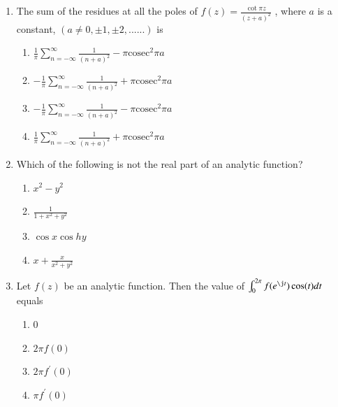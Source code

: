\documentclass[journal,12pt,twocolumn]{IEEEtran}
\begin{document}
\begin{enumerate}[1.]
\item The sum of the residues at all the poles of $ f(z) = \frac{\cot \pi z}{(z+a) ^ 2}$ , where $a$ is a constant, $(a \neq 0, \pm 1, \pm 2,......)$ is

\begin{enumerate}

\item $
\frac{1}{\pi} \sum\limits_{n= -\infty}^{\infty} \frac{1}{(n+a)^2} - \pi \text{cosec}^2 \pi a
$


\item $
-\frac{1}{\pi} \sum\limits_{n= -\infty}^{\infty} \frac{1}{(n+a)^2} + \pi \text{cosec}^2 \pi a
$


\item $
-\frac{1}{\pi} \sum\limits_{n= -\infty}^{\infty} \frac{1}{(n+a)^2} - \pi \text{cosec}^2 \pi a
$


\item $
\frac{1}{\pi} \sum\limits_{n= -\infty}^{\infty} \frac{1}{(n+a)^2} + \pi \text{cosec}^2 \pi a
$

\end{enumerate}

\item Which of the following is not the real part of an analytic function?

\begin{enumerate}

\item $
x^2-y^2
$

\item $
\frac{1}{1+x^2+y^2}
$

\item $
\cos x \cos h y
$

\item $
x+ \frac{x}{x^2+y^2}
$

\end{enumerate}

\item Let $f(z)$ be an analytic function. Then the value of $\int_{0}^{2 \pi} f(e^{\j t}) \cos (t) dt $ equals

\begin{enumerate}

\item $
0
$

\item $
2 \pi f(0) 
$

\item $
2 \pi f^\prime(0) 
$

\item $
\pi f^\prime(0)
$


\end{enumerate}
\end{enumerate}
\end{document}
